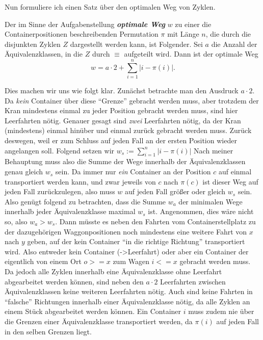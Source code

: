 Nun formuliere ich einen Satz über den optimalen Weg von Zyklen.
\begin{center}
\begin{minipage}[c]{.8\textwidth}
 Der im Sinne der Aufgabenstellung \emph{\textbf{optimale Weg}} $w$ zu einer die Containerpositionen beschreibenden Permutation $\pi$ mit Länge $n$,
  die durch die disjunkten Zyklen $Z$ dargestellt werden kann, ist Folgender.
 Sei $a$ die Anzahl der Äquivalenzklassen, in die $Z$ durch $\equiv$ aufgeteilt wird.
 Dann ist der optimale Weg \[w = a \cdot 2 + \sum_{i = 1}^{n}{\lvert i-\pi(i)\rvert}. \]
\end{minipage}
\end{center}
Dies machen wir uns wie folgt klar. Zunächst betrachte man den Ausdruck $a \cdot 2$.
Da \emph{kein} Container über diese ``Grenze'' gebracht werden muss, aber trotzdem der Kran mindestens einmal zu jeder Position gebracht werden muss, sind hier Leerfahrten nötig.
Genauer gesagt sind \emph{zwei} Leerfahrten nötig, da der Kran (mindestens) einmal hinüber und einmal zurück gebracht werden muss.
Zurück deswegen, weil er zum Schluss auf jeden Fall an der ersten Position wieder angelangen soll.
Folgend setzen wir $w_s := \sum_{i = 1}^{n}{\lvert i-\pi(i)\rvert}$
Nach meiner Behauptung muss also die Summe der Wege innerhalb der Äquivalenzklassen genau gleich $w_s$ sein.
Da immer nur \emph{ein} Container an der Position $c$ auf einmal transportiert werden kann,
und zwar jeweils von $c$ nach $\pi(c)$ ist dieser Weg auf jeden Fall zurückzulegen, also muss $w$ auf jeden Fall größer oder gleich $w_s$ sein.
Also genügt folgend zu betrachten, dass die Summe $w_a$ der minimalen Wege innerhalb jeder Äquivalenzklasse maximal $w_s$ ist.
Angenommen, dies wäre nicht so, also $w_a > w_s$.
Dann müsste es neben den Fahrten vom Containerstellplatz zu der dazugehörigen Waggonpositionen noch mindestens eine weitere Fahrt von $x$ nach $y$ geben,
auf der kein Container ``in die richtige Richtung'' transportiert wird.
Also entweder kein Container (->Leerfahrt) oder aber ein Container der eigentlich von einem Ort $o >= x$ zum Wagen $i <= x$ gebracht werden muss.
Da jedoch alle Zyklen innerhalb eine Äquivalenzklasse ohne Leerfahrt abgearbeitet werden können,
sind neben den $a \cdot 2$ Leerfahrten zwischen Äquivalenzklassen keine weiteren Leerfahrten nötig.
Auch sind keine Fahrten in ``falsche'' Richtungen innerhalb einer Äquivalenzklasse nötig, da alle Zyklen an einem Stück abgearbeitet werden können.
Ein Container $i$ muss zudem nie über die Grenzen einer Äquivalenzklasse transportiert werden, da $\pi(i)$ auf jeden Fall in den selben Grenzen liegt.

